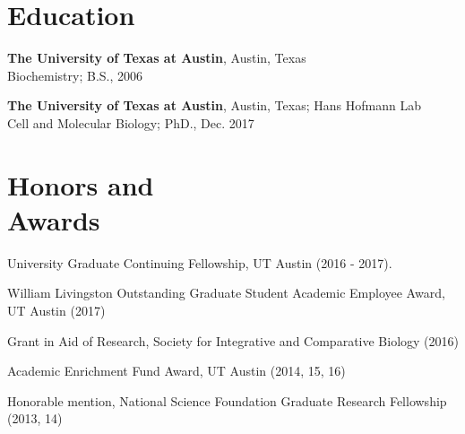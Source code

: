 \documentclass[margin,line]{resume}
\begin{document}
\pagestyle{plain}

\begin{resume}




    \section{\mysidestyle Education} 

\begin{description}[leftmargin=0pt] 
\setlength{\itemsep}{4pt}
\item[] {\bf The University of Texas at Austin}, Austin, Texas \\Biochemistry; B.S., 2006
\item[] {\bf The University of Texas at Austin}, Austin, Texas; Hans Hofmann Lab
\\Cell and Molecular Biology; PhD., Dec. 2017
\end{description}
    
    \section{\mysidestyle Honors and\\Awards} 

\begin{description}[leftmargin=0pt]  
\setlength{\itemsep}{3pt} 
\item[] University Graduate Continuing Fellowship, UT Austin (2016 - 2017).
\item[] William Livingston Outstanding Graduate Student Academic Employee Award, UT Austin (2017)
\item[] Grant in Aid of Research,  Society for Integrative and Comparative Biology (2016)
\item[] Academic Enrichment Fund Award, UT Austin (2014, 15, 16)
\item[] Honorable mention, National Science Foundation Graduate Research Fellowship (2013, 14)
\end{description}


\end{resume}
\end{document}
